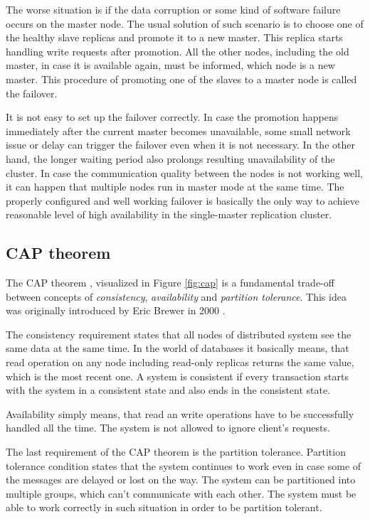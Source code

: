 \documentclass[
  digital, %
  twoside, %
  table,   %
  lof,     %
  lot,     %
]{fithesis3}
\begin{document}
The worse situation is if the data corruption or some kind of software failure occurs on the master node. The usual solution of such scenario is to choose one of the healthy slave replicas and promote it to a new master. This replica starts handling write requests after promotion. All the other nodes, including the old master, in case it is available again, must be informed, which node is a new master. This procedure of promoting one of the slaves to a master node is called the failover.

It is not easy to set up the failover correctly. In case the promotion happens immediately after the current master becomes unavailable, some small network issue or delay can trigger the failover even when it is not necessary. In the other hand, the longer waiting period also prolongs resulting unavailability of the cluster. In case the communication quality between the nodes is not working well, it can happen that multiple nodes run in master mode at the same time. The properly configured and well working failover is basically the only way to achieve reasonable level of high availability in the single-master replication cluster.

\subsection{CAP theorem}
The CAP theorem \cite{cap}, visualized in Figure \ref{fig:cap} is a fundamental trade-off between concepts of \textit{consistency}, \textit{availability} and \textit{partition tolerance}. This idea was originally introduced by Eric Brewer in 2000 \cite{brewer_cap}.

The consistency requirement states that all nodes of distributed system see the same data at the same time. In the world of databases it basically means, that read operation on any node including read-only replicas returns the same value, which is the most recent one. A system is consistent if every transaction starts with the system in a consistent state and also ends in the consistent state.

Availability simply means, that read an write operations have to be successfully handled all the time. The system is not allowed to ignore client's requests.

The last requirement of the CAP theorem is the partition tolerance. Partition tolerance condition states that the system continues to work even in case some of the messages are delayed or lost on the way. The system can be partitioned into multiple groups, which can't communicate with each other. The system must be able to work correctly in such situation in order to be partition tolerant.
\end{document}
